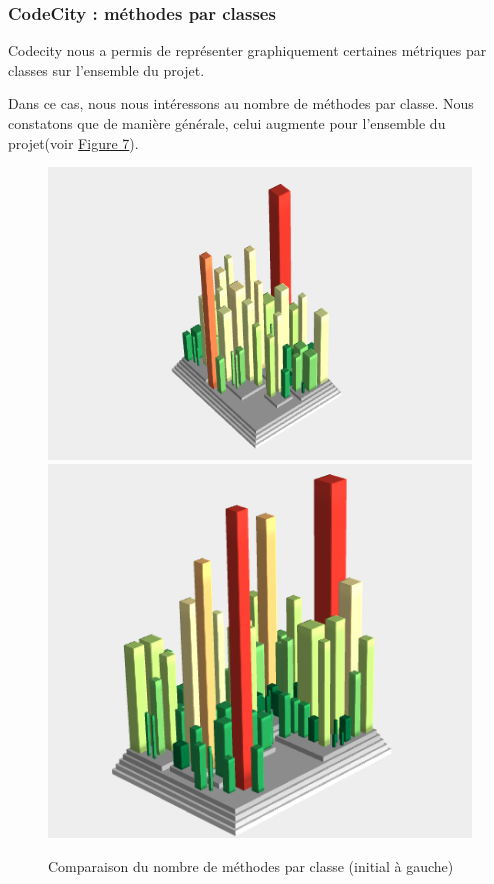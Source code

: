 \documentclass[a4paper,12pt]{report} %
\begin{document}
\subsubsection{CodeCity : méthodes par classes}
Codecity nous a permis de représenter graphiquement certaines métriques
par classes sur l'ensemble du projet.

Dans ce cas, nous nous intéressons au nombre de méthodes par classe. Nous constatons que de manière générale, celui augmente pour l'ensemble du projet(voir \hyperref[figure7]{Figure 7}).

\begin{figure}[!h]
\includegraphics[scale=0.5]{ressources/final_initial_declared_methods}\includegraphics[scale=0.5]{ressources/final_new_declared_methods}\caption{Comparaison du nombre de méthodes par classe (initial à gauche)}\label{figure7}


\end{figure}
\end{document}

